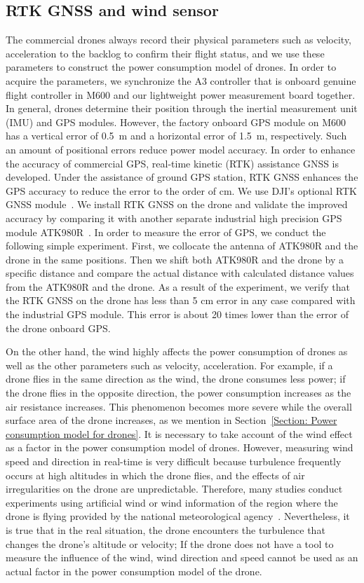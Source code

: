 \documentclass[journal]{./template/IEEEtran}
\begin{document}
\subsection{RTK GNSS and wind sensor}
The commercial drones always record their physical parameters such as velocity, acceleration to the backlog to confirm their flight status, and we use these parameters to construct the power consumption model of drones.
In order to acquire the parameters, we synchronize the A3 controller that is onboard genuine flight controller in M600 and our lightweight power measurement board together. 
In general, drones determine their position through the inertial measurement unit (IMU) and GPS modules. 
However, the factory onboard GPS module on M600 has a vertical error of 0.5~m and a horizontal error of 1.5~m, respectively. 
Such an amount of positional errors reduce power model accuracy.
In order to enhance the accuracy of commercial GPS, real-time kinetic (RTK) assistance GNSS is developed. Under the assistance of ground GPS station, RTK GNSS enhances the GPS accuracy to reduce the error to the order of cm. We use DJI's optional RTK GNSS module~\cite{ref_13}.
We install RTK GNSS on the drone and validate the improved accuracy by comparing it with another separate industrial high precision GPS module ATK980R~\cite{ref_14}.
In order to measure the error of GPS, we conduct the following simple experiment. 
First, we collocate the antenna of ATK980R and the drone in the same positions. 
Then we shift both ATK980R and the drone by a specific distance and compare the actual distance with calculated distance values from the ATK980R and the drone.
As a result of the experiment, we verify that the RTK GNSS on the drone has less than 5 cm error in any case compared with the industrial GPS module. This error is about 20 times lower than the error of the drone onboard GPS.

On the other hand, the wind highly affects the power consumption of drones as well as the other parameters such as velocity, acceleration.
For example, if a drone flies in the same direction as the wind, the drone consumes less power; if the drone flies in the opposite direction, the power consumption increases as the air resistance increases. 
This phenomenon becomes more severe while the overall surface area of the drone increases, as we mention in Section~\ref{Section: Power consumption model for drones}.
It is necessary to take account of the wind effect as a factor in the power consumption model of drones. 
However, measuring wind speed and direction in real-time is very difficult because turbulence frequently occurs at high altitudes in which the drone flies, and the effects of air irregularities on the drone are unpredictable.
Therefore, many studies conduct experiments using artificial wind or wind information of the region where the drone is flying provided by the national meteorological agency~\cite{ref_5,ref_9}. 
Nevertheless, it is true that in the real situation, the drone encounters the turbulence that changes the drone's altitude or velocity; 
If the drone does not have a tool to measure the influence of the wind, wind direction and speed cannot be used as an actual factor in the power consumption model of the drone. 
\end{document}
